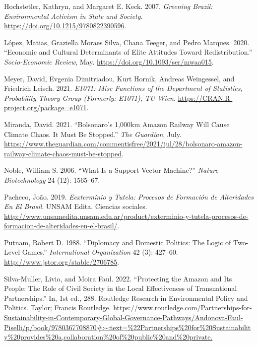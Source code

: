 \documentclass[
]{article}
\newlength{\cslhangindent}
\newlength{\cslentryspacingunit} %
\newenvironment{CSLReferences}[2] %
 {%
  \setlength{\parindent}{0pt}
  \ifodd #1
  \let\oldpar\par
  \def\par{\hangindent=\cslhangindent\oldpar}
  \fi
  \setlength{\parskip}{#2\cslentryspacingunit}
 }%
 {}
\begin{document}
\begin{CSLReferences}{1}{0}
\leavevmode{}%
Hochstetler, Kathryn, and Margaret E. Keck. 2007. \emph{Greening Brazil:
Environmental Activism in State and Society}.
\url{https://doi.org/10.1215/9780822390596}.

\leavevmode{}%
López, Matias, Graziella Moraes Silva, Chana Teeger, and Pedro Marques.
2020. {``Economic and Cultural Determinants of Elite Attitudes Toward
Redistribution.''} \emph{Socio-Economic Review}, May.
\url{https://doi.org/10.1093/ser/mwaa015}.

\leavevmode{}%
Meyer, David, Evgenia Dimitriadou, Kurt Hornik, Andreas Weingessel, and
Friedrich Leisch. 2021. \emph{E1071: Misc Functions of the Department of
Statistics, Probability Theory Group (Formerly: E1071), TU Wien}.
\url{https://CRAN.R-project.org/package=e1071}.

\leavevmode{}%
Miranda, David. 2021. {``Bolsonaro{'}s 1,000km Amazon Railway Will Cause
Climate Chaos. It Must Be Stopped.''} \emph{The Guardian}, July.
\url{https://www.theguardian.com/commentisfree/2021/jul/28/bolsonaro-amazon-railway-climate-chaos-must-be-stopped}.

\leavevmode{}%
Noble, William S. 2006. {``What Is a Support Vector Machine?''}
\emph{Nature Biotechnology} 24 (12): 1565--67.

\leavevmode{}%
Pacheco, João. 2019. \emph{Ecxterminio y Tutela: Procesos de Formación
de Alteridades En El Brasil}. UNSAM Edita. Ciencias sociales.
\url{http://www.unsamedita.unsam.edu.ar/product/exterminio-y-tutela-procesos-de-formacion-de-alteridades-en-el-brasil/}.

\leavevmode{}%
Putnam, Robert D. 1988. {``Diplomacy and Domestic Politics: The Logic of
Two-Level Games.''} \emph{International Organization} 42 (3): 427--60.
\url{http://www.jstor.org/stable/2706785}.

\leavevmode{}%
Silva-Muller, Livio, and Moira Faul. 2022. {``Protecting the Amazon and
Its People: The Role of Civil Society in the Local Effectiveness of
Transnational Partnerships.''} In, 1st ed., 288. Routledge Research in
Environmental Policy and Politics. Taylor; Francis Routledge.
\url{https://www.routledge.com/Partnerships-for-Sustainability-in-Contemporary-Global-Governance-Pathways/Andonova-Faul-Piselli/p/book/9780367708870\#:~:text=\%22Partnerships\%20for\%20Sustainability\%20provides\%20a,collaboration\%20of\%20public\%20and\%20private.}


\end{CSLReferences}
\end{document}
